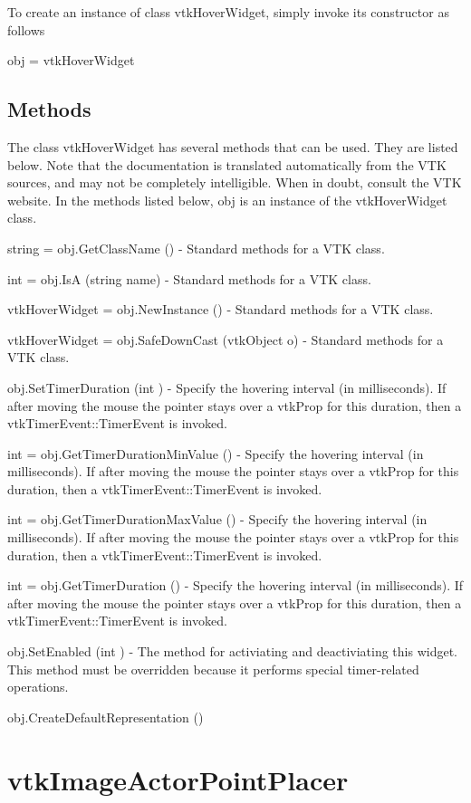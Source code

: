 To create an instance of class vtk\-Hover\-Widget, simply invoke its constructor as follows \begin{DoxyVerb}  obj = vtkHoverWidget
\end{DoxyVerb}
 \hypertarget{vtkwidgets_vtkxyplotwidget_Methods}{}\subsection{Methods}\label{vtkwidgets_vtkxyplotwidget_Methods}
The class vtk\-Hover\-Widget has several methods that can be used. They are listed below. Note that the documentation is translated automatically from the V\-T\-K sources, and may not be completely intelligible. When in doubt, consult the V\-T\-K website. In the methods listed below, {\ttfamily obj} is an instance of the vtk\-Hover\-Widget class. 
\begin{DoxyItemize}
\item {\ttfamily string = obj.\-Get\-Class\-Name ()} -\/ Standard methods for a V\-T\-K class.  
\item {\ttfamily int = obj.\-Is\-A (string name)} -\/ Standard methods for a V\-T\-K class.  
\item {\ttfamily vtk\-Hover\-Widget = obj.\-New\-Instance ()} -\/ Standard methods for a V\-T\-K class.  
\item {\ttfamily vtk\-Hover\-Widget = obj.\-Safe\-Down\-Cast (vtk\-Object o)} -\/ Standard methods for a V\-T\-K class.  
\item {\ttfamily obj.\-Set\-Timer\-Duration (int )} -\/ Specify the hovering interval (in milliseconds). If after moving the mouse the pointer stays over a vtk\-Prop for this duration, then a vtk\-Timer\-Event\-::\-Timer\-Event is invoked.  
\item {\ttfamily int = obj.\-Get\-Timer\-Duration\-Min\-Value ()} -\/ Specify the hovering interval (in milliseconds). If after moving the mouse the pointer stays over a vtk\-Prop for this duration, then a vtk\-Timer\-Event\-::\-Timer\-Event is invoked.  
\item {\ttfamily int = obj.\-Get\-Timer\-Duration\-Max\-Value ()} -\/ Specify the hovering interval (in milliseconds). If after moving the mouse the pointer stays over a vtk\-Prop for this duration, then a vtk\-Timer\-Event\-::\-Timer\-Event is invoked.  
\item {\ttfamily int = obj.\-Get\-Timer\-Duration ()} -\/ Specify the hovering interval (in milliseconds). If after moving the mouse the pointer stays over a vtk\-Prop for this duration, then a vtk\-Timer\-Event\-::\-Timer\-Event is invoked.  
\item {\ttfamily obj.\-Set\-Enabled (int )} -\/ The method for activiating and deactiviating this widget. This method must be overridden because it performs special timer-\/related operations.  
\item {\ttfamily obj.\-Create\-Default\-Representation ()}  
\end{DoxyItemize}\hypertarget{vtkwidgets_vtkimageactorpointplacer}{}\section{vtk\-Image\-Actor\-Point\-Placer}\label{vtkwidgets_vtkimageactorpointplacer}
